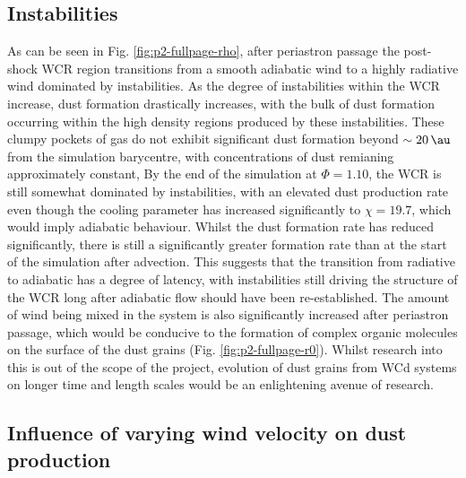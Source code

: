 \documentclass[fleqn,usenatbib]{mnras}
\begin{document}
\subsection{Instabilities}


As can be seen in Fig. \ref{fig:p2-fullpage-rho}, after periastron passage the post-shock WCR region transitions from a smooth adiabatic wind to a highly radiative wind dominated by instabilities.
As the degree of instabilities within the WCR increase, dust formation drastically increases, with the bulk of dust formation occurring within the high density regions produced by these instabilities.
These clumpy pockets of gas do not exhibit significant dust formation beyond $\sim \SI{20}{\au}$ from the simulation barycentre, with concentrations of dust remianing approximately constant, 
By the end of the simulation at $\Phi = 1.10$, the WCR is still somewhat dominated by instabilities, with an elevated dust production rate even though the cooling parameter has increased significantly to $\chi = 19.7$, which would imply adiabatic behaviour.
Whilst the dust formation rate has reduced significantly, there is still a significantly greater formation rate than at the start of the simulation after advection.
This suggests that the transition from radiative to adiabatic has a degree of latency, with instabilities still driving the structure of the WCR long after adiabatic flow should have been re-established.
The amount of wind being mixed in the system is also significantly increased after periastron passage, which would be conducive to the formation of complex organic molecules on the surface of the dust grains (Fig. \ref{fig:p2-fullpage-r0}).
Whilst research into this is out of the scope of the project, evolution of dust grains from WCd systems on longer time and length scales would be an enlightening avenue of research.

\subsection{Influence of varying wind velocity on dust production}
\end{document}

